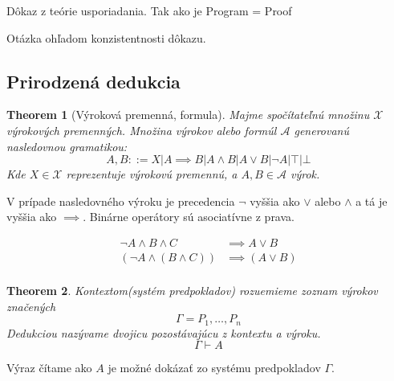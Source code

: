 \documentclass[a4paper,10pt,oneside]{report}%
\newtheorem{theorem}{Theorem}
\begin{document}
Dôkaz z teórie usporiadania. Tak ako je Program = Proof

Otázka ohľadom konzistentnosti dôkazu.

\subsection{Prirodzená dedukcia}

\begin{theorem}[Výroková premenná, formula]
    Majme spočítateľnú množinu $\mathcal{X}$ výrokových premenných. Množina výrokov
    alebo formúl $\mathcal{A}$ generovanú nasledovnou gramatikou:
    \begin{equation}
        A, B ::= X | A \implies B | A \wedge B | A \vee B | \neg A | \top | \bot
    \end{equation}
    Kde $X \in \mathcal{X}$ reprezentuje výrokovú premennú, a $A, B \in \mathcal{A}$
    výrok.
\end{theorem}

V prípade nasledovného výroku je precedencia $\neg$ vyššia ako $\vee$ alebo $\wedge$
a tá je vyššia ako $\implies$. Binárne operátory sú asociatívne z prava.

\begin{align*}
    \neg A \wedge B \wedge C &\implies A \vee B \\
    (\neg A \wedge (B \wedge C)) &\implies (A \vee B) \\
\end{align*}

\begin{theorem}
    Kontextom(systém predpokladov) rozuemieme zoznam výrokov značených
    \begin{equation}
        \Gamma = P_{1}, \dots , P_{n}
    \end{equation}
    Dedukciou nazývame dvojicu pozostávajúcu z kontextu a výroku.
    \begin{equation}
        \Gamma \vdash A
    \end{equation}
\end{theorem}

Výraz čítame ako $A$ je možné dokázať zo systému predpokladov $\Gamma$.
\end{document}
